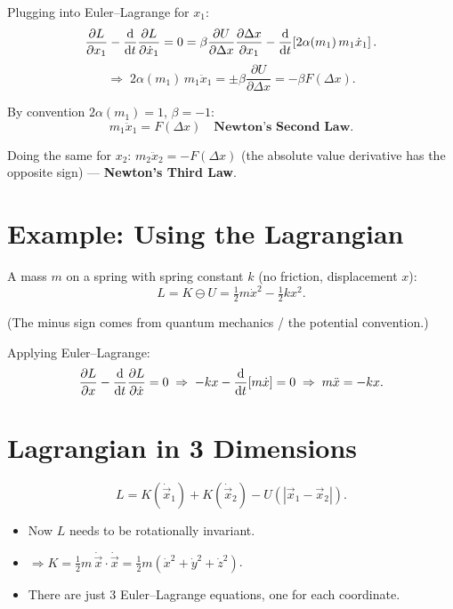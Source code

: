 Plugging into Euler--Lagrange for $x_1$:
\[
    \frac{\partial L}{\partial x_1} - \dv{t}\frac{\partial L}{\partial \dot{x}_1}
    = 0
    = \beta\frac{\partial U}{\partial \Delta x}\frac{\partial \Delta x}{\partial x_1}
    - \dv{t}\!\left[2\alpha(m_1)\,m_1\dot{x}_1\right].
\]
\[
    \Rightarrow\; 2\alpha(m_1)\,m_1\ddot{x}_1 = \pm\beta\frac{\partial U}{\partial \Delta x}
    = -\beta F(\Delta x).
\]

By convention $2\alpha(m_1) = 1$, $\beta = -1$:
\[
    \boxed{m_1\ddot{x}_1 = F(\Delta x)} \quad \textbf{Newton's Second Law}.
\]

Doing the same for $x_2$: $m_2\ddot{x}_2 = -F(\Delta x)$ (the absolute value
derivative has the opposite sign) — \textbf{Newton's Third Law}.

\section{Example: Using the Lagrangian}

A mass $m$ on a spring with spring constant $k$ (no friction, displacement $x$):
\[
    L = K \ominus U = \tfrac{1}{2}m\dot{x}^2 - \tfrac{1}{2}kx^2.
\]

(The minus sign comes from quantum mechanics / the potential convention.)

Applying Euler--Lagrange:
\[
    \frac{\partial L}{\partial x} - \dv{t}\frac{\partial L}{\partial \dot{x}} = 0
    \;\Rightarrow\;
    -kx - \dv{t}\!\left[m\dot{x}\right] = 0
    \;\Rightarrow\; m\ddot{x} = -kx.
\]

\section{Lagrangian in 3 Dimensions}

\[
    L = K(\dot{\vec{x}}_1) + K(\dot{\vec{x}}_2) - U(|\vec{x}_1 - \vec{x}_2|).
\]

\begin{itemize}
    \item Now $L$ needs to be rotationally invariant.
    \item $\Rightarrow K = \tfrac{1}{2}m\,\dot{\vec{x}}\cdot\dot{\vec{x}}
        = \tfrac{1}{2}m(\dot{x}^2 + \dot{y}^2 + \dot{z}^2)$.
    \item There are just 3 Euler--Lagrange equations, one for each coordinate.
\end{itemize}

